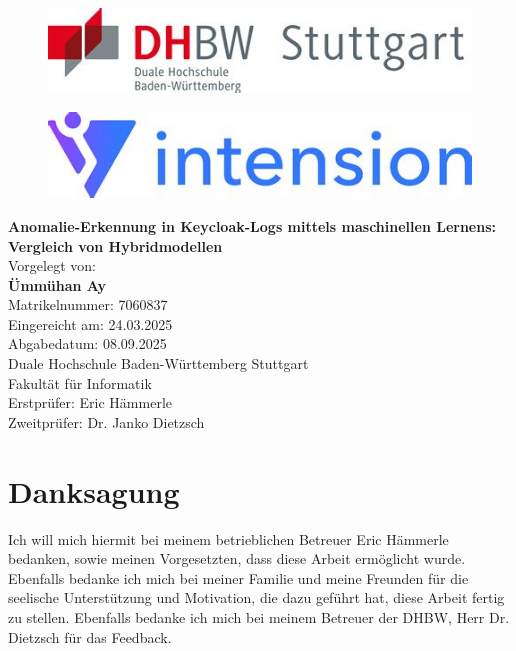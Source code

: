 \documentclass[a4paper,12pt]{article}
\begin{document}
	\thispagestyle{empty}
	
	\begin{center}
		\begin{figure}[h]
			\centering
			\begin{minipage}{0.3\linewidth}
				\centering
				\includegraphics[width=\linewidth]{Bilder/screenshot017}
				\label{fig:screenshot017}
			\end{minipage}
			\hspace{4cm}
			\begin{minipage}{0.3\linewidth}
				\centering
				\includegraphics[width=\linewidth]{Bilder/screenshot018}
				\label{fig:screenshot018}
			\end{minipage}
		\end{figure}
		\vspace*{2cm}
		\Huge\textbf{Anomalie-Erkennung in Keycloak-Logs mittels maschinellen Lernens: Vergleich von Hybridmodellen} \\[1.5cm]
		
		\normalsize
		Vorgelegt von: \\[0.3cm]
		\textbf{Ümmühan Ay} \\
		Matrikelnummer: 7060837 \\[1cm]
		
		Eingereicht am: 24.03.2025 \\[0.3cm]
		Abgabedatum: 08.09.2025 \\[1cm]
		
		Duale Hochschule Baden-Württemberg Stuttgart\\
		Fakultät für Informatik \\[2cm]
		
		Erstprüfer: Eric Hämmerle \\
		Zweitprüfer: Dr. Janko Dietzsch
		
	\end{center}
	\newpage
	\section*{Danksagung}
	Ich will mich hiermit bei meinem betrieblichen Betreuer Eric Hämmerle bedanken, sowie meinen Vorgesetzten, dass diese Arbeit ermöglicht wurde. Ebenfalls bedanke ich mich bei meiner Familie und meine Freunden für die seelische Unterstützung und Motivation, die dazu geführt hat, diese Arbeit fertig zu stellen. Ebenfalls bedanke ich mich bei meinem Betreuer der DHBW, Herr Dr. Dietzsch für das Feedback.
	
\end{document}

